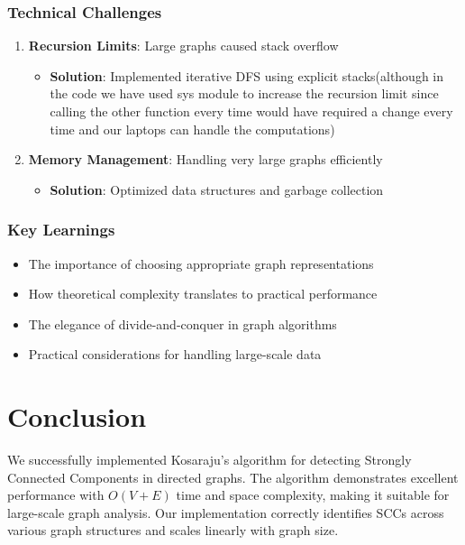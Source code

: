 \documentclass{book}
\theoremstyle{definition}
\begin{document}
\subsection{Technical Challenges}

\begin{enumerate}
    \item \textbf{Recursion Limits}: Large graphs caused stack overflow
    \begin{itemize}
        \item \textbf{Solution}: Implemented iterative DFS using explicit stacks(although in the code we have used sys module to increase the recursion limit since calling the other function every time would have required a change every time and our laptops can handle the computations)
    \end{itemize}
    
    \item \textbf{Memory Management}: Handling very large graphs efficiently
    \begin{itemize}
        \item \textbf{Solution}: Optimized data structures and garbage collection
    \end{itemize}
\end{enumerate}

\subsection{Key Learnings}

\begin{itemize}
    \item The importance of choosing appropriate graph representations
    \item How theoretical complexity translates to practical performance
    \item The elegance of divide-and-conquer in graph algorithms
    \item Practical considerations for handling large-scale data
\end{itemize}



\chapter{Conclusion}
We successfully implemented Kosaraju's algorithm for detecting Strongly Connected Components in directed graphs. The algorithm demonstrates excellent performance with $O(V + E)$ time and space complexity, making it suitable for large-scale graph analysis. Our implementation correctly identifies SCCs across various graph structures and scales linearly with graph size.
\end{document}
